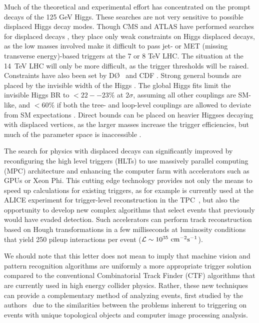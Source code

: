 \documentclass[aps,prl,twocolumn,preprintnumbers,groupedaddress,nofootinbib]{revtex4}
\begin{document}
Much of the theoretical and experimental effort has concentrated on the prompt decays of the 125 GeV Higgs. These searches are not very sensitive to possible displaced Higgs decay modes. Though CMS and ATLAS have performed searches for displaced decays \cite{Aad:2013txa,Chatrchyan:2012cg,CMS:2014wda}, they place only weak constraints on Higgs displaced decays, as the low masses involved make it difficult to pass jet- or MET (missing transverse energy)-based triggers at the 7 or 8 TeV LHC. The situation at the 14~TeV LHC will only be more difficult, as the trigger thresholds will be raised. Constraints have also been set by D\O\ \cite{Abazov:2009ik} and CDF \cite{Aaltonen:2011rja}. Strong general bounds are placed by the invisible width of the Higgs \cite{Bai:2011wz,Cheung:2013kla,Belanger:2013kya}. The global Higgs fits limit the invisible Higgs BR to $<22--23\%$ at $2\sigma$, assuming all other couplings are SM-like, and $<60\%$ if both the tree- and loop-level couplings are allowed to deviate from SM expectations \cite{Cheung:2013kla,Belanger:2013kya}. Direct bounds can be placed on heavier Higgses decaying with displaced vertices, as the larger masses increase the trigger efficiencies, but much of the parameter space is inaccessible \cite{Chatrchyan:2012cg}. %

The search for physics with displaced decays can significantly improved by reconfiguring the high level triggers (HLTs) to use  massively parallel computing (MPC) architecture and enhancing the computer farm with accelerators such as GPUs or Xeon Phi. This cutting edge technology provides not only the means to speed up calculations for existing triggers, as for example is currently used at the ALICE experiment for trigger-level reconstruction in the TPC~\cite{Rohr:2012nf}, but also the opportunity to develop new complex algorithms that select events that previously would have evaded detection. Such accelerators can perform track reconstruction based on Hough transformations \cite{hough} in a few milliseconds at luminosity conditions that yield 250 pileup interactions per event  (${\cal L} \sim 10^{35}~\mbox{cm$^{-2}$s$^{-1}$}$).  

We should note that this letter does not mean to imply that machine vision and pattern recognition algorithms are uniformly a more appropriate trigger solution compared to the conventional Combinatorial Track Finder (CTF) algorithms that are currently used in high energy collider physics. Rather, these new techniques can provide a complementary method of analyzing events, first studied by the authors~\cite{Halyo:2013iba} due to the similarities between the problems inherent to triggering on events with unique topological objects and computer image processing analysis. 
\end{document}
